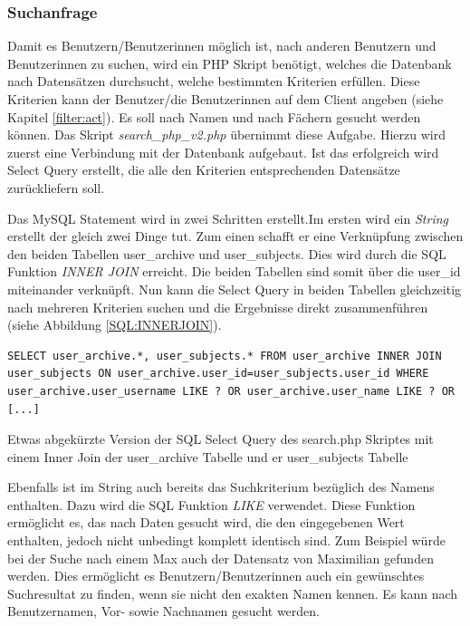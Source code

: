 \documentclass[a4paper,11pt]{report}
\newenvironment{code}{\captionsetup{type=figure}}{}
\begin{document}
					\subsubsection{Suchanfrage} \label{sssec:Suchanfrage}
					Damit es Benutzern/Benutzerinnen möglich ist, nach anderen Benutzern und Benutzerinnen zu suchen, wird ein PHP Skript benötigt, welches die Datenbank nach Datensätzen durchsucht, welche bestimmten Kriterien erfüllen. Diese Kriterien kann der Benutzer/die Benutzerinnen auf dem Client angeben (siehe Kapitel \ref{filter:act}). Es soll nach Namen und nach Fächern gesucht werden können. Das Skript \emph{search\_php\_v2.php} übernimmt diese Aufgabe. Hierzu wird zuerst eine Verbindung mit der Datenbank aufgebaut. Ist das erfolgreich wird Select Query erstellt, die alle den Kriterien entsprechenden Datensätze zurückliefern soll. 
					
					Das MySQL Statement wird in zwei Schritten erstellt.Im ersten wird ein \emph{String} erstellt der gleich zwei Dinge tut. Zum einen schafft er eine Verknüpfung zwischen den beiden Tabellen user\_archive und user\_subjects. Dies wird durch die SQL Funktion \emph{INNER JOIN} erreicht. Die beiden Tabellen sind somit über die user\_id miteinander verknüpft. Nun kann die Select Query in beiden Tabellen gleichzeitig nach mehreren Kriterien suchen und die Ergebnisse direkt zusammenführen (siehe Abbildung \ref{SQL:INNERJOIN}).
\begin{code}
\begin{verbatim}
SELECT user_archive.*, user_subjects.* FROM user_archive INNER JOIN user_subjects ON user_archive.user_id=user_subjects.user_id WHERE user_archive.user_username LIKE ? OR user_archive.user_name LIKE ? OR [...]
\end{verbatim}
	\caption{Etwas abgekürzte Version der SQL Select Query des search.php Skriptes mit einem Inner Join der user\_archive Tabelle und er user\_subjects Tabelle}
	\label{SQL:INNERJOIN}
\end{code}	
					Ebenfalls ist im String auch bereits das Suchkriterium bezüglich des Namens enthalten. Dazu wird die SQL Funktion \emph{LIKE} verwendet. Diese Funktion ermöglicht es, das nach Daten gesucht wird, die den eingegebenen Wert enthalten, jedoch nicht unbedingt komplett identisch sind. Zum Beispiel würde bei der Suche nach einem \glqq Max\grqq{} auch der Datensatz von \glqq Maximilian\grqq{} gefunden werden. Dies ermöglicht es Benutzern/Benutzerinnen auch ein gewünschtes Suchresultat zu finden, wenn sie nicht den exakten Namen kennen. Es kann nach Benutzernamen, Vor- sowie Nachnamen gesucht werden.
					
\end{document}
